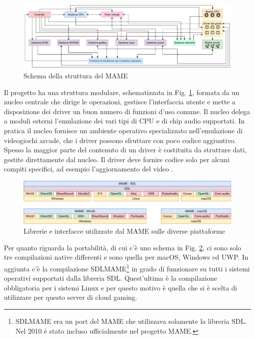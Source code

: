 \begin{figure}[H]
	\includegraphics[width=\linewidth]{immagini/mame_schema_moduli_d}
	\caption{Schema della struttura del MAME}
	\label{fig:mame_schema_moduli_d}
\end{figure}

Il progetto ha una struttura modulare, schematizzata in Fig. \ref{fig:mame_schema_moduli_d}, formata da un nucleo centrale che dirige le operazioni, gestisce l’interfaccia utente e mette a disposizione dei driver un buon numero di funzioni d'uso comune. Il nucleo delega a moduli esterni l'emulazione dei vari tipi di CPU e di chip audio supportati. In pratica il nucleo fornisce un ambiente operativo specializzato nell'emulazione di videogiochi arcade, che i driver possono sfruttare con poco codice aggiuntivo. Spesso la maggior parte del contenuto di un driver è costituita da strutture dati, gestite direttamente dal nucleo. Il driver deve fornire codice solo per alcuni compiti specifici, ad esempio l'aggiornamento del video \parencite{Il_progetto_MAME}.

\begin{figure}[H]
	\includegraphics[width=\linewidth]{immagini/mame_architettura_full}
	\caption{Librerie e interfacce utilizzate dal MAME sulle diverse piattaforme}
	\label{fig:mame_architettura_full}
\end{figure}

Per quanto riguarda la portabilità, di cui c'è uno schema in Fig. \ref{fig:mame_architettura_full}, ci sono solo tre compilazioni native differenti e sono quella per macOS, Windows ed UWP. In aggiunta c'è la compilazione SDLMAME\footnote{SDLMAME era un port del MAME che utilizzava solamente la libreria SDL. Nel 2010 è stato incluso ufficialmente nel progetto MAME.} in grado di funzionare su tutti i sistemi operativi supportati dalla libreria SDL. Quest'ultima è la compilazione obbligatoria per i sistemi Linux e per questo motivo è quella che si è scelta di utilizzare per questo server di cloud gaming.

